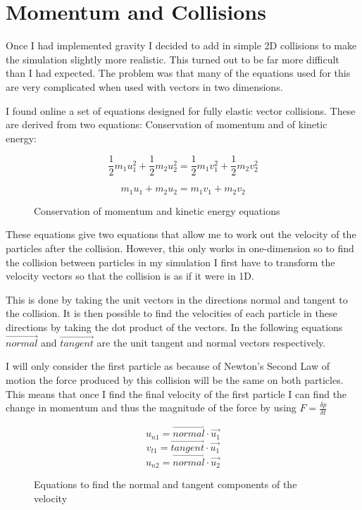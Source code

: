 \section{Momentum  and Collisions}
	Once I had implemented gravity I decided to add in simple 2D collisions to make the simulation slightly more realistic. This turned out to be far more difficult than I had expected. The problem was that many of the equations used for this are very complicated when used with vectors in two dimensions.
	
	I found online a set of equations designed for fully elastic vector collisions. These are derived from two equations: Conservation of momentum and of kinetic energy:
	
	\begin{figure}[h]
		\begin{equation}
		\frac{1}{2}m_{1}u_{1}^2 + \frac{1}{2}m_{2}u_{2}^2 = \frac{1}{2}m_{1}v_{1}^2 + \frac{1}{2}m_{2}v_{2}^2
		\end{equation}
		
		\begin{equation}
		m_{1}u_{1} + m_{2}u_{2} = m_{1}v_{1} + m_{2}v_{2}
		\end{equation}
		\caption{Conservation of momentum and kinetic energy equations}
		\label{fig:movEqn}
	\end{figure}

	These equations give two equations that allow me to work out the velocity of the particles after the collision. However, this only works in one-dimension so to find the collision between particles in my simulation I first have to transform the velocity vectors so that the collision is as if it were in 1D. 
	
	This is done by taking the unit vectors in the directions normal and tangent to the collision. It is then possible to find the velocities of each particle in these directions by taking the dot product of the vectors. In the following equations $\vec{normal}$ and $\vec{tangent}$ are the unit tangent and normal vectors respectively.
	
	I will only consider the first particle as because of Newton's Second Law of motion the force produced by this collision will be the same on both particles. This means that once I find the final velocity of the first particle I can find the change in momentum and thus the magnitude of the force by using $F = \frac{\delta p}{\delta t}$
	
	\begin{figure}[h!]
		\begin{equation}
			u_{n1} = \vec{normal} \cdot \vec{u_1}
		\end{equation}
		\begin{equation}
			v_{t1} = \vec{tangent} \cdot \vec{u_1}
		\end{equation}
		\begin{equation}
			u_{n2} = \vec{normal} \cdot \vec{u_2}
		\end{equation}
		\caption{Equations to find the normal and tangent components of the velocity}
		\label{fig:compEqn}
	\end{figure}
		
